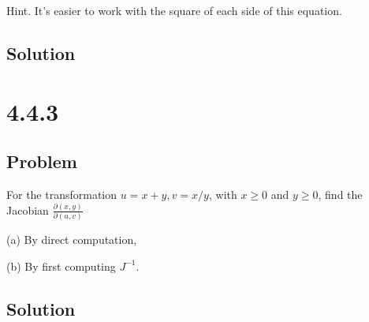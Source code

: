 \documentclass[12pt]{article}
\begin{document}
Hint. It's easier to work with the square of each side of this equation.

\subsection{Solution}

\newpage
\section{4.4.3}

\subsection{Problem}

For the transformation \(u=x+y, v=x / y\), with \(x \geq 0\) and \(y \geq 0\), find the Jacobian \(\frac{\partial(x, y)}{\partial(u, v)}\)

(a) By direct computation,

(b) By first computing \(J^{-1}\).

\subsection{Solution}

\newpage


\nocite{arfken2013mathematical}
\nocite{El-Deeb_PEU-356_Assignments}
\end{document}
